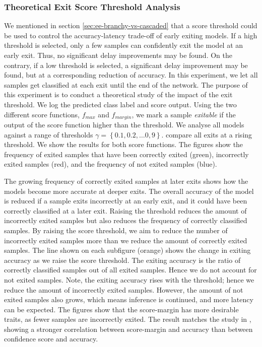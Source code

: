 \subsubsection{Theoretical Exit Score Threshold Analysis}
We mentioned in section \ref{sec:ee-branchy-vs-cascaded} that a score threshold could be used to control the accuracy-latency trade-off of early exiting models. If a high threshold is selected, only a few samples can confidently exit the model at an early exit. Thus, no significant delay improvements may be found. On the contrary, if a low threshold is selected, a significant delay improvement may be found, but at a corresponding reduction of accuracy. 
In this experiment, we let all samples get classified at each exit until the end of the network. The purpose of this experiment is to conduct a theoretical study of the impact of the exit threshold. We log the predicted class label and score output. Using the two different score functions, $ f_{max} $ and $ f_{margin} $, we mark a sample \emph{exitable} if the output of the score function higher than the threshold. We analyse all models against a range of thresholds $ \gamma = \left\{0.1, 0.2, \dots 0,9\right\} $.
 compare all exits at a rising threshold. We show the results for both score functions.
The figures show the frequency of exited samples that have been correctly exited ({\color{sns-green}green}), incorrectly exited samples ({\color{sns-red}red}), and the frequency of not exited samples ({\color{sns-blue}blue}). 

The growing frequency of correctly exited samples at later exits shows how the models become more accurate at deeper exits. The overall accuracy of the model is reduced if a sample exits incorrectly at an early exit, and it could have been correctly classified at a later exit. Raising the threshold reduces the amount of incorrectly exited samples but also reduces the frequency of correctly classified samples. 
By raising the score threshold, we aim to reduce the number of incorrectly exited samples more than we reduce the amount of correctly exited samples. The line shown on each subfigure ({\color{sns-orange}orange}) shows the change in exiting accuracy as we raise the score threshold. The exiting accuracy is the ratio of correctly classified samples out of all exited samples. Hence we do not account for not exited samples. 
Note, the exiting accuracy rises with the threshold; hence we reduce the amount of incorrectly exited samples. However, the amount of not exited samples also grows, which means inference is continued, and more latency can be expected.
The figures show that the score-margin has more desirable traits, as fewer samples are incorrectly exited. The result matches the study in \cite{park_big/little_2015,tann_flexible_2018}, showing a stronger correlation between score-margin and accuracy than between confidence score and accuracy. 

